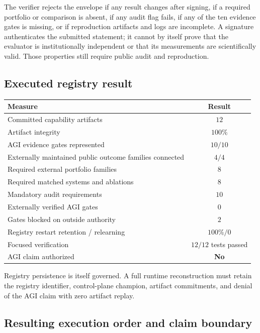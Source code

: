 The verifier rejects the envelope if any result changes after signing, if a
required portfolio or comparison is absent, if any audit flag fails, if any of
the ten evidence gates is missing, or if reproduction artifacts and logs are
incomplete.  A signature authenticates the submitted statement; it cannot by
itself prove that the evaluator is institutionally independent or that its
measurements are scientifically valid.  Those properties still require public
audit and reproduction.


\subsection{Executed registry result}
\label{subsec:agi-registry-results}

\begin{center}
\small
\begin{tabular}{|>{\raggedright\arraybackslash}p{7.2cm}|c|}
\hline
\textbf{Measure} & \textbf{Result} \\
\hline
Committed capability artifacts & $12$ \\
\hline
Artifact integrity & $100\%$ \\
\hline
AGI evidence gates represented & $10/10$ \\
\hline
Externally maintained public outcome families connected & $4/4$ \\
\hline
Required external portfolio families & $8$ \\
\hline
Required matched systems and ablations & $8$ \\
\hline
Mandatory audit requirements & $10$ \\
\hline
Externally verified AGI gates & $0$ \\
\hline
Gates blocked on outside authority & $2$ \\
\hline
Registry restart retention / relearning & $100\%/0$ \\
\hline
Focused verification & $12/12$ tests passed \\
\hline
AGI claim authorized & \textbf{No} \\
\hline
\end{tabular}
\end{center}

Registry persistence is itself governed.  A full runtime reconstruction must
retain the registry identifier, control-plane champion, artifact commitments,
and denial of the AGI claim with zero artifact replay.


\subsection{Resulting execution order and claim boundary}
\label{subsec:agi-registry-next-work}

